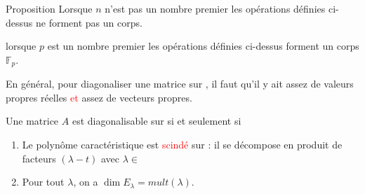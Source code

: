     \begin{theoreme}{Proposition}
        Lorsque $n$ n'est pas un nombre premier les opérations définies ci-dessus ne forment pas un corps.
    \end{theoreme}
\begin{theoreme}
    lorsque $p$ est un nombre premier les opérations définies ci-dessus forment un corps $\mathbb{F}_p$.
\end{theoreme}
    En général, pour diagonaliser une matrice sur \R, il faut qu'il y ait assez de valeurs propres réelles \textcolor{red}{et} assez de vecteurs propres.
    \begin{theoreme}
        Une matrice $A$ est diagonalisable sur \R si et seulement si 
        \begin{enumerate}
            \item Le polynôme caractéristique est \textcolor{red}{scindé} sur \R : il se décompose en produit de facteurs $(\lambda - t)$ avec $\lambda \in $ \R
            \item Pour tout $\lambda$, on a $\dim E_\lambda = mult(\lambda)$.
        \end{enumerate}
    \end{theoreme}
    
